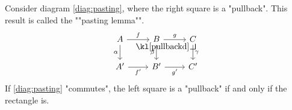 \documentclass[main.tex]{subfiles}
\begin{document}
\begin{thm}\label{lem:pasting}
    Consider diagram \eqref{diag:pasting}, where the right square is a "pullback". This result is called the ""pasting lemma"".
    \begin{equation}\label{diag:pasting}
        \begin{tikzcd}
            A \arrow[r, "f"] \arrow[d, "\alpha"'] & B \arrow[r, "g"] \arrow[d, "\beta"'] \arrow[rd, phantom ,"\pullbackd", very near start] & C \arrow[d, "\gamma"] \\
            A' \arrow[r, "f'"']                   & B' \arrow[r, "g'"']                                                      & C'                   
        \end{tikzcd}       
    \end{equation}
    If \eqref{diag:pasting} "commutes", the left square is a "pullback" if and only if the rectangle is.
\end{thm}
\end{document}
